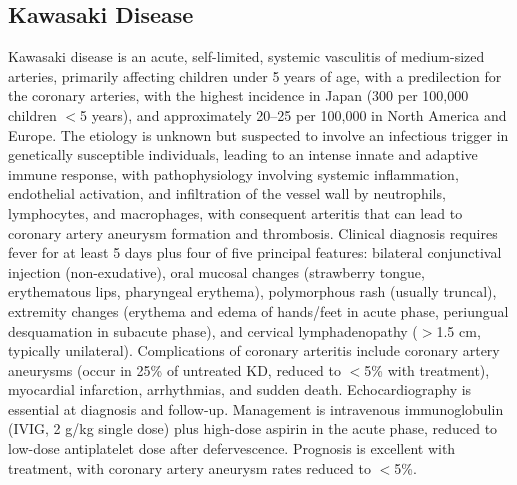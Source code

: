 \subsection{Kawasaki Disease}
\label{sec:Kawasaki Disease}
Kawasaki disease is an acute, self-limited, systemic vasculitis of medium-sized arteries, primarily affecting children under 5 years of age, with a predilection for the coronary arteries, with the highest incidence in Japan (300 per 100,000 children $<$5 years), and approximately 20--25 per 100,000 in North America and Europe. The etiology is unknown but suspected to involve an infectious trigger in genetically susceptible individuals, leading to an intense innate and adaptive immune response, with pathophysiology involving systemic inflammation, endothelial activation, and infiltration of the vessel wall by neutrophils, lymphocytes, and macrophages, with consequent arteritis that can lead to coronary artery aneurysm formation and thrombosis. Clinical diagnosis requires fever for at least 5 days plus four of five principal features: bilateral conjunctival injection (non-exudative), oral mucosal changes (strawberry tongue, erythematous lips, pharyngeal erythema), polymorphous rash (usually truncal), extremity changes (erythema and edema of hands/feet in acute phase, periungual desquamation in subacute phase), and cervical lymphadenopathy ($>$1.5 cm, typically unilateral). Complications of coronary arteritis include coronary artery aneurysms (occur in 25\% of untreated KD, reduced to $<$5\% with treatment), myocardial infarction, arrhythmias, and sudden death. Echocardiography is essential at diagnosis and follow-up. Management is intravenous immunoglobulin (IVIG, 2 g/kg single dose) plus high-dose aspirin in the acute phase, reduced to low-dose antiplatelet dose after defervescence. Prognosis is excellent with treatment, with coronary artery aneurysm rates reduced to $<$5\%.

